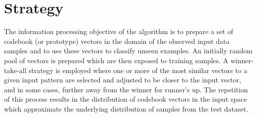 \documentclass[a4paper, 11pt]{article}
\begin{document}

\section{Strategy}
\label{sec:strategy}
The information processing objective of the algorithm is to prepare a set of codebook (or prototype) vectors in the domain of the observed input data samples and to use these vectors to classify unseen examples.
An initially random pool of vectors is prepared which are then exposed to training samples. A winner-take-all strategy is employed where one or more of the most similar vectors to a given input pattern are selected and adjusted to be closer to the input vector, and in some cases, further away from the winner for runner's up. The repetition of this process results in the distribution of codebook vectors in the input space which approximate the underlying distribution of samples from the test dataset.
\end{document}
